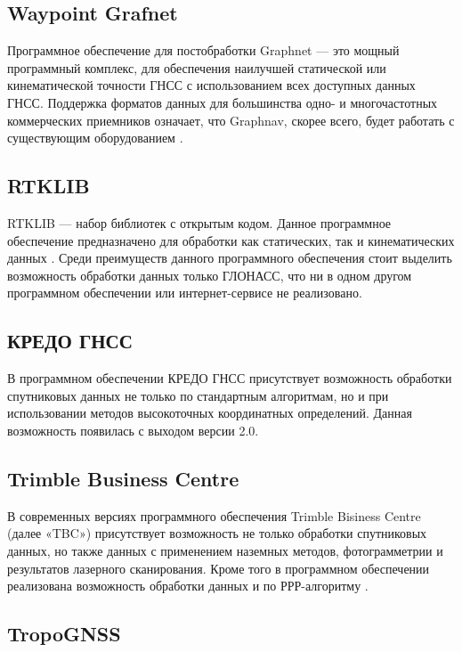 \subsection{Waypoint Grafnet} \label{subsec:ch2/sec2/sub3}

Программное обеспечение для постобработки Graphnet --- это мощный программный комплекс, для обеспечения наилучшей статической или кинематической точности ГНСС с использованием всех доступных данных ГНСС. Поддержка форматов данных для большинства одно- и многочастотных коммерческих приемников означает, что Graphnav, скорее всего, будет работать с существующим оборудованием \cite{src67}.

\subsection{RTKLIB} \label{subsec:ch2/sec2/sub4}

RTKLIB --- набор библиотек с открытым кодом. Данное программное обеспечение предназначено для обработки как статических, так и кинематических данных \cite{src72}. Среди преимуществ данного программного обеспечения стоит выделить возможность обработки данных только ГЛОНАСС, что ни в одном другом программном обеспечении или интернет-сервисе не реализовано.  

\subsection{КРЕДО ГНСС} \label{subsec:ch2/sec2/sub5}

В программном обеспечении КРЕДО ГНСС присутствует возможность обработки спутниковых данных не только по стандартным алгоритмам, но и при использовании методов высокоточных координатных определений. Данная возможность появилась с выходом версии 2.0.

\subsection{Trimble Business Centre}\label{subsec:ch2/sec2/sub6}

В современных версиях программного обеспечения Trimble Bisiness Centre (далее «TBC») присутствует возможность не только обработки спутниковых данных, но также данных с применением наземных методов, фотограмметрии и результатов лазерного сканирования. Кроме того в программном обеспечении реализована возможность обработки данных и по РРР-алгоритму \cite{src65,src67}.

\subsection{TropoGNSS}\label{subsec:ch2/sec2/sub7}

